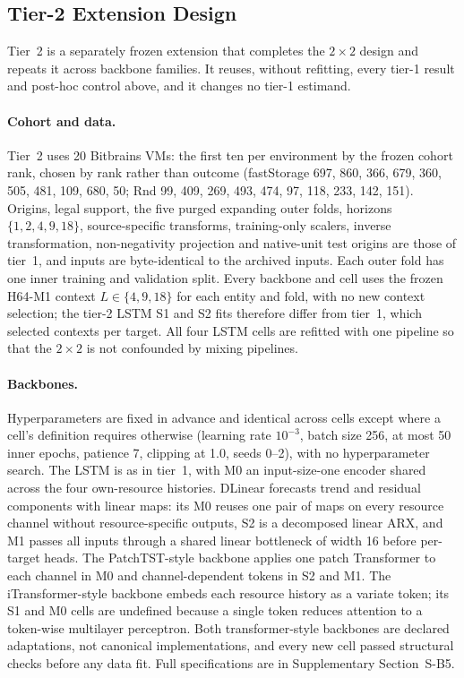 \documentclass[5p,twocolumn]{elsarticle}
\begin{document}
\subsection{Tier-2 Extension Design}
\label{sec:tier2-design}

Tier~2 is a separately frozen extension that completes the $2\times2$ design
and repeats it across backbone families. It reuses, without refitting, every
tier-1 result and post-hoc control above, and it changes no tier-1 estimand.

\paragraph{Cohort and data.} Tier~2 uses 20 Bitbrains VMs: the first ten per
environment by the frozen cohort rank, chosen by rank rather than outcome
(fastStorage 697, 860, 366, 679, 360, 505, 481, 109, 680, 50; Rnd 99, 409,
269, 493, 474, 97, 118, 233, 142, 151). Origins, legal support, the five
purged expanding outer folds, horizons $\{1,2,4,9,18\}$, source-specific
transforms, training-only scalers, inverse transformation, non-negativity
projection and native-unit test origins are those of tier~1, and inputs are
byte-identical to the archived inputs. Each outer fold has one inner
training and validation split. Every backbone and cell uses the frozen H64-M1
context $L\in\{4,9,18\}$ for each entity and fold, with no new context
selection; the tier-2 LSTM S1 and S2 fits therefore differ from tier~1, which
selected contexts per target. All four LSTM cells are refitted with one
pipeline so that the $2\times2$ is not confounded by mixing pipelines.

\paragraph{Backbones.} Hyperparameters are fixed in advance and identical
across cells except where a cell's definition requires otherwise (learning
rate $10^{-3}$, batch size 256, at most 50 inner epochs, patience 7, clipping
at 1.0, seeds 0--2), with no hyperparameter search. The LSTM is as in tier~1,
with M0 an input-size-one encoder shared across the four own-resource
histories. DLinear \citep{Zeng2023DLinear} forecasts trend and residual
components with linear maps: its M0 reuses one pair of maps on every
resource channel without resource-specific outputs, S2 is a decomposed linear
ARX, and M1 passes all inputs through a shared linear bottleneck of width 16
before per-target heads. The PatchTST-style backbone \citep{Nie2023PatchTST}
applies one patch Transformer to each channel in M0 and channel-dependent
tokens in S2 and M1. The iTransformer-style backbone
\citep{Liu2024iTransformer} embeds each resource history as a variate token;
its S1 and M0 cells are undefined because a single token reduces attention to
a token-wise multilayer perceptron. Both transformer-style backbones are
declared adaptations, not canonical implementations, and every new cell
passed structural checks before any data fit. Full specifications are in
Supplementary Section~S-B5.
\end{document}
